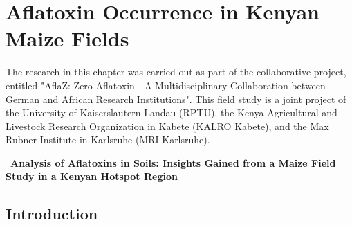 \chapter{Aflatoxin Occurrence in Kenyan Maize Fields} \label{Chapter3}

\begin{refsection} %

\vspace*{\fill}

\large
The research in this chapter was carried out as part of the collaborative project, entitled "AflaZ: Zero Aflatoxin - A Multidisciplinary Collaboration between German and African Research Institutions". This field study is a joint project of the University of Kaiserslautern-Landau (RPTU), the Kenya Agricultural and Livestock Research Organization in Kabete (KALRO Kabete), and the Max Rubner Institute in Karlsruhe (MRI Karlsruhe).

\clearpage



{\raggedright 
\
\textbf{\LARGE Analysis of Aflatoxins in Soils: Insights Gained from a Maize Field Study in a Kenyan Hotspot Region}}

\section{Introduction}


\end{refsection}
